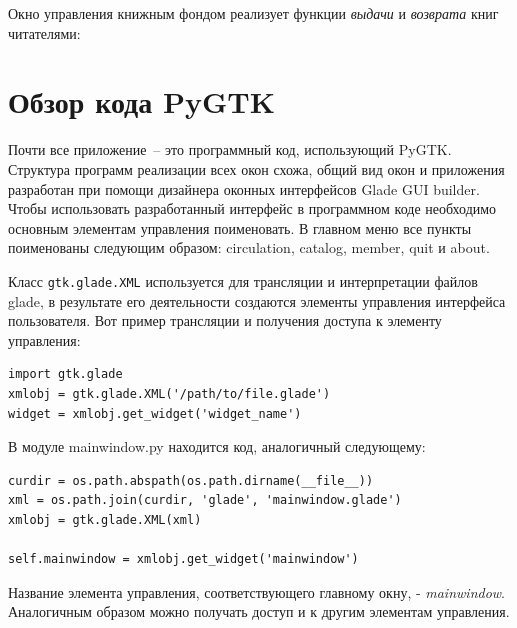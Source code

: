 \documentclass[a4paper,openany,twoside,draft]{book}
\providecommand*{\DUroletitlereference}[1]{\textsl{#1}}
\begin{document}
Окно управления книжным фондом реализует функции \emph{выдачи} и \emph{возврата} книг читателями:

\noindent{}


\section{Обзор кода PyGTK%
  \label{pygtk}%
}

Почти все приложение~-- это программный код, использующий PyGTK. Структура программ реализации всех окон схожа, общий вид окон и приложения разработан при помощи дизайнера оконных интерфейсов Glade GUI builder.  Чтобы использовать разработанный интерфейс в программном коде необходимо основным элементам управления поименовать.  В главном меню все пункты поименованы следующим образом: \textquotedbl{}circulation\textquotedbl{}, \textquotedbl{}catalog\textquotedbl{}, \textquotedbl{}member\textquotedbl{}, \textquotedbl{}quit\textquotedbl{} и \textquotedbl{}about\textquotedbl{}.

Класс \texttt{gtk.glade.XML} используется для трансляции и интерпретации файлов glade, в результате его деятельности создаются элементы управления интерфейса пользователя.  Вот пример трансляции и получения доступа к элементу управления:

\begin{verbatim}
import gtk.glade
xmlobj = gtk.glade.XML('/path/to/file.glade')
widget = xmlobj.get_widget('widget_name')
\end{verbatim}

В модуле mainwindow.py находится код, аналогичный следующему:

\begin{verbatim}
curdir = os.path.abspath(os.path.dirname(__file__))
xml = os.path.join(curdir, 'glade', 'mainwindow.glade')
xmlobj = gtk.glade.XML(xml)

self.mainwindow = xmlobj.get_widget('mainwindow')
\end{verbatim}

Название элемента управления, соответствующего главному окну, - \DUroletitlereference{mainwindow}.  Аналогичным образом можно получать доступ и к другим элементам управления.
\end{document}
